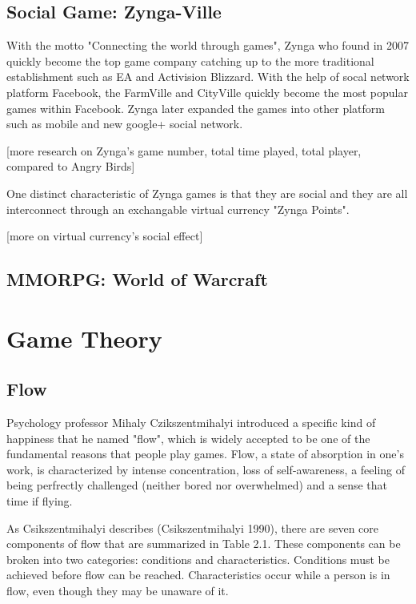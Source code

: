 \subsection{Social Game: Zynga-Ville}
With the motto  "Connecting the world through games", Zynga who found in 2007 quickly become the top game company catching up to the more traditional establishment such as EA and Activision Blizzard. With the help of socal network platform Facebook, the FarmVille and CityVille quickly become the most popular games within Facebook. Zynga later expanded the games into other platform such as mobile and  new google+ social network. 

[more research on Zynga's game number, total time played, total player, compared to Angry Birds]

One distinct characteristic of Zynga games is that they are social and they are all interconnect through an exchangable virtual currency "Zynga Points". 

[more on virtual currency's social effect]

\subsection{MMORPG: World of Warcraft}

\section{Game Theory}

\subsection{Flow}
Psychology professor Mihaly Czikszentmihalyi introduced a specific kind of happiness that he named "flow", which is widely accepted to be one of the fundamental reasons that people play games. Flow, a state of absorption in one's work, is characterized by intense concentration, loss of self-awareness, a feeling of being perfrectly challenged (neither bored nor overwhelmed) and a sense that time if flying. 

As Csikszentmihalyi describes (Csikszentmihalyi 1990), there are seven core components of flow that are summarized in Table 2.1. These components can be broken into two categories: conditions and characteristics. Conditions must be achieved before flow can be reached. Characteristics occur while a person is in flow, even though they may be unaware of it.

